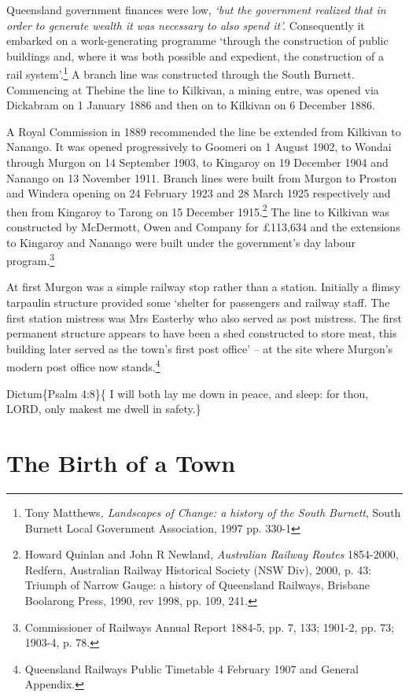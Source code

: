 Queensland government finances were low, \emph{`but the government realized that in order to generate wealth it was necessary to also spend it'.} Consequently it embarked on a work-generating programme `through the construction of public buildings and, where it was both possible and expedient, the construction of a rail system'.\footnote{Tony Matthews\emph{, Landscapes of Change: a history of the South Burnett}, South Burnett Local Government Association, 1997 pp. 330-1} A branch line was constructed through the South Burnett. Commencing at Thebine the line to Kilkivan, a mining entre, was opened via Dickabram on 1 January 1886 and then on to Kilkivan on 6 December 1886.

A Royal Commission in 1889 recommended the line be extended from Kilkivan to Nanango. It was opened progressively to Goomeri on 1 August 1902, to Wondai through Murgon on 14 September 1903, to Kingaroy on 19 December 1904 and Nanango on 13 November 1911. Branch lines were built from Murgon to Proston and Windera opening on 24 February 1923 and 28 March 1925 respectively and then from Kingaroy to Tarong on 15 December 1915.\footnote{Howard Quinlan and John R Newland, \emph{Australian Railway Routes} 1854-2000, Redfern, Australian Railway Historical Society (NSW Div), 2000, p. 43: Triumph of Narrow Gauge: a history of Queensland Railways, Brisbane Boolarong Press, 1990, rev 1998, pp. 109, 241.} The line to Kilkivan was constructed by McDermott, Owen and Company for £113,634 and the extensions to Kingaroy and Nanango were built under the government's day labour program.\footnote{Commissioner of Railways Annual Report 1884-5, pp. 7, 133; 1901-2, pp. 73; 1903-4, p. 78.}

At first Murgon was a simple railway stop rather than a station. Initially a flimsy tarpaulin structure provided some `shelter for passengers and railway staff. The first station mistress was Mrs Easterby who also served as post mistress. The first permanent structure appears to have been a shed constructed to store meat, this building later served as the town's first post office' -- at the site where Murgon's modern post office now stands.\footnote{Queensland Railways Public Timetable 4 February 1907 and General Appendix.}

Dictum\{Psalm 4:8\}\{ I will both lay me down in peace, and sleep: for thou, LORD, only makest me dwell in safety.\}

\hypertarget{the-birth-of-a-town}{%
\chapter{The Birth of a Town}\label{the-birth-of-a-town}}


